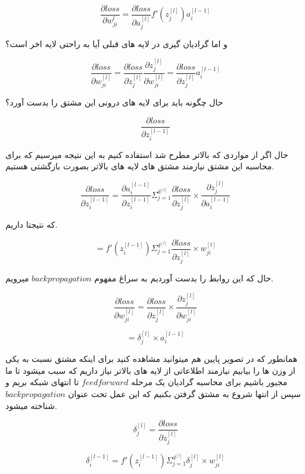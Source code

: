 \documentclass[12pt]{article}
\begin{document}
\[
\frac{\partial loss}{\partial w_{ji}^{l}} = \frac{\partial loss}{\partial a_{j}^{[l]}} f'(z_{j}^{[l]}) a_{i}^{[l - 1]}
\]

و اما گرادیان گیری در لایه های قبلی آیا به راحتی لایه اخر است؟

\[
\frac{\partial loss}{\partial w_{ji}^{[l]}} = \frac{\partial loss}{\partial z_{j}^{[l]}} \frac{\partial z_{j}^{[l]}}{\partial w_{ji}^{[l]}} = \frac{\partial loss}{\partial z_{j}^{[l]}} a_{i}^{[l -1]}
\]

حال چگونه باید برای لایه های درونی این مشتق را بدست آورد؟

\[
\frac{\partial loss}{\partial z_{i}^{[l - 1]}}
\]

حال اگر از مواردی که بالاتر مطرح شد استفاده کنیم به این نتیجه میرسیم که برای محاسبه این مشتق نیازمند مشتق های لایه های بالاتر بصورت بازگشتی هستیم.

\[
\frac{\partial loss}{\partial z_{i}^{[l - 1]}} = \frac{\partial a_{i}^{[l - 1]}}{\partial z_{i}^{[l - 1]}} \Sigma_{j = 1}^{d^{[l]}} \frac{\partial loss}{\partial z_{j}^{[l]}} \times \frac{\partial z_{j}^{[l]}}{\partial a_{i}^{[l - 1]}}
\]

که نتیجتا داریم.

\[
= f'(z_{i}^{[l-1]}) \Sigma_{j = 1}^{d^{[l]}} \frac{\partial loss}{\partial z_{j}^{[l]}} \times w_{ji}^{[l]}
\]

حال که این روابط را بدست آوردیم به سراغ مفهوم 
$backpropagation$
میرویم.

\[
\frac{\partial loss}{\partial w_{ji}^{[l]}} = \frac{\partial loss}{\partial z_{j}^{[l]}} \times \frac{\partial z_{j}^{[l]}}{\partial w_{ji}^{[l]}}
\]

\[
= \delta_{j}^{[l]} \times a_{i}^{[l-1]}
\]

همانطور که در تصویر پایین هم میتوانید مشاهده کنید برای اینکه مشتق نسبت به یکی از وزن ها را بیابیم نیازمند اطلاعاتی از لایه های بالاتر نیاز داریم که سبب میشود تا ما مجبور باشیم برای محاسبه گرادیان یک مرحله 
$feedforward$
تا انتهای شبکه بریم و سپس از انتها شروع به مشتق گرفتن بکنیم که این عمل تحت عنوان 
$backpropagation$
شناخته میشود.

\[
\delta_{j}^{[l]} = \frac{\partial loss}{\partial z_{j}^{[l]}}
\]

\[
\delta_{i}^{[l-1]} = f'(z_{i}^{[l-1]}) \Sigma_{j=1}^{d^{[l]}} \delta_{j}^{[l]} \times w_{ji}^{[l]}
\]
\end{document}
